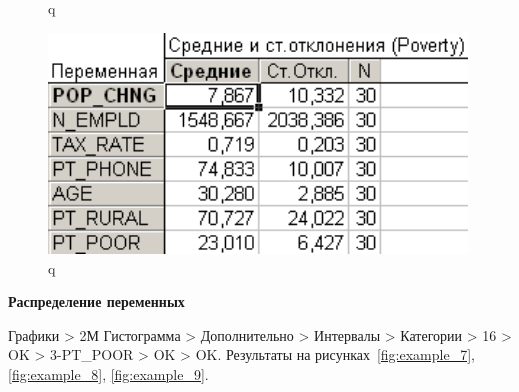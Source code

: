 \begin{figure}[!h]
\begin{minipage}{0.36\textwidth}
    \caption{q}
    \label{fig:example_5}
  \end{minipage}
  \begin{minipage}{0.24\textwidth}
    \centering

    \includegraphics[width=0.99\textwidth]
    {inc/example_6.PNG}

    \caption{q}
    \label{fig:example_6}
  \end{minipage}
\end{figure}

\newpage

\begin{center}
  \textbf{Распределение переменных}
\end{center}

Графики > 2М Гистограмма > Дополнительно > Интервалы > Категории > 16 > OK
> 3-PT\_POOR > OK > OK. Результаты на рисунках~\ref{fig:example_7}, \ref{fig:example_8}, \ref{fig:example_9}.

